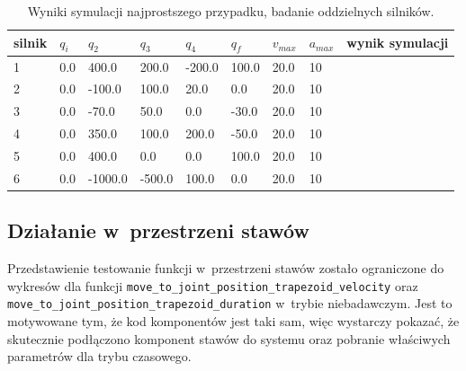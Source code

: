 \documentclass[a4paper, 12pt]{article}
\begin{document}
	\begin{table}[H]
	\centering
	\begin{tabular}{|m{2.5em}|m{3em}|m{3.5em}|m{3em}|m{3em}|m{3em}|m{4em}|m{3em}|m{5em}|}
	\hline
	silnik&$ q_i $ & $ q_2 $ & $ q_3 $ & $q_4$ & $ q_f $ & $ v_{max} $ & $ a_{max} $&wynik symulacji\\
	\hline
	\hline
	\hspace{1em}1& 0.0 & 400.0 & 200.0 & -200.0 & 100.0 & 20.0 & 10&\hspace{2em}\checkmark\\ %
	\hline
	\hspace{1em}2& 0.0 & -100.0 & 100.0 & 20.0 & 0.0 & 20.0 & 10&\hspace{2em}\checkmark\\ %
	\hline
	\hspace{1em}3& 0.0 & -70.0 & 50.0 & 0.0 & -30.0 & 20.0 & 10&\hspace{2em}\checkmark\\ %
	\hline
	\hspace{1em}4& 0.0 & 350.0 & 100.0 & 200.0 & -50.0 & 20.0 & 10&\hspace{2em}\checkmark\\  %
	\hline
	\hspace{1em}5& 0.0 & 400.0 & 0.0 & 0.0 & 100.0 & 20.0 & 10&\hspace{2em}\checkmark\\  %
	\hline
	\hspace{1em}6& 0.0 & -1000.0 & -500.0 & 100.0 & 0.0 & 20.0 & 10&\hspace{2em}\checkmark\\  %
	\hline
	\end{tabular}
	\caption{Wyniki symulacji najprostszego przypadku, badanie oddzielnych silników.}
	\label{tab:setup12}
	\end{table}	
	
	\subsection{Działanie w~przestrzeni stawów}
	Przedstawienie testowanie funkcji w~przestrzeni stawów zostało ograniczone do wykresów dla funkcji \texttt{move\_to\_joint\_position\_trapezoid\_velocity} oraz \texttt{move\_to\_joint\_position\_trapezoid\_duration} w~trybie niebadawczym. Jest to motywowane tym, że kod komponentów jest taki sam, więc wystarczy pokazać, że skutecznie podłączono komponent stawów do systemu oraz pobranie właściwych parametrów dla trybu czasowego.
\end{document}
